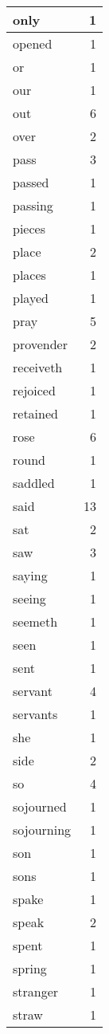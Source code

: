 \begin{center}
\begin{longtable}{l|r}
only & 1 \\ \hline
opened & 1 \\ \hline
or & 1 \\ \hline
our & 1 \\ \hline
out & 6 \\ \hline
over & 2 \\ \hline
pass & 3 \\ \hline
passed & 1 \\ \hline
passing & 1 \\ \hline
pieces & 1 \\ \hline
place & 2 \\ \hline
places & 1 \\ \hline
played & 1 \\ \hline
pray & 5 \\ \hline
provender & 2 \\ \hline
receiveth & 1 \\ \hline
rejoiced & 1 \\ \hline
retained & 1 \\ \hline
rose & 6 \\ \hline
round & 1 \\ \hline
saddled & 1 \\ \hline
said & 13 \\ \hline
sat & 2 \\ \hline
saw & 3 \\ \hline
saying & 1 \\ \hline
seeing & 1 \\ \hline
seemeth & 1 \\ \hline
seen & 1 \\ \hline
sent & 1 \\ \hline
servant & 4 \\ \hline
servants & 1 \\ \hline
she & 1 \\ \hline
side & 2 \\ \hline
so & 4 \\ \hline
sojourned & 1 \\ \hline
sojourning & 1 \\ \hline
son & 1 \\ \hline
sons & 1 \\ \hline
spake & 1 \\ \hline
speak & 2 \\ \hline
spent & 1 \\ \hline
spring & 1 \\ \hline
stranger & 1 \\ \hline
straw & 1 \\ \hline

\end{longtable}
\end{center}

